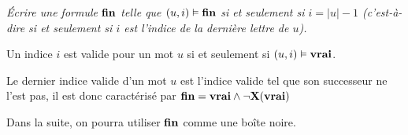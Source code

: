 \medskip
\begin{Exercise}\it
Écrire une formule ${\bf fin}$ telle que $(u,i)\vDash {\bf fin}$ si et seulement si $i=|u|-1$ (c'est-à-dire si et seulement si $i$ est l'indice de la dernière lettre de $u$).
\end{Exercise}
\begin{Answer}
Un indice $i$ est valide pour un mot $u$ si et seulement si $(u,i) \vDash {\bf vrai}$.

Le dernier indice valide d'un mot $u$ est l'indice valide tel que son successeur ne l'est pas, il est donc caractérisé par 
${\bf fin} = {\bf vrai} \wedge \neg {\bf X}({\bf vrai})$
\end{Answer}
Dans la suite, on pourra utiliser ${\bf fin}$ comme une boîte noire.

